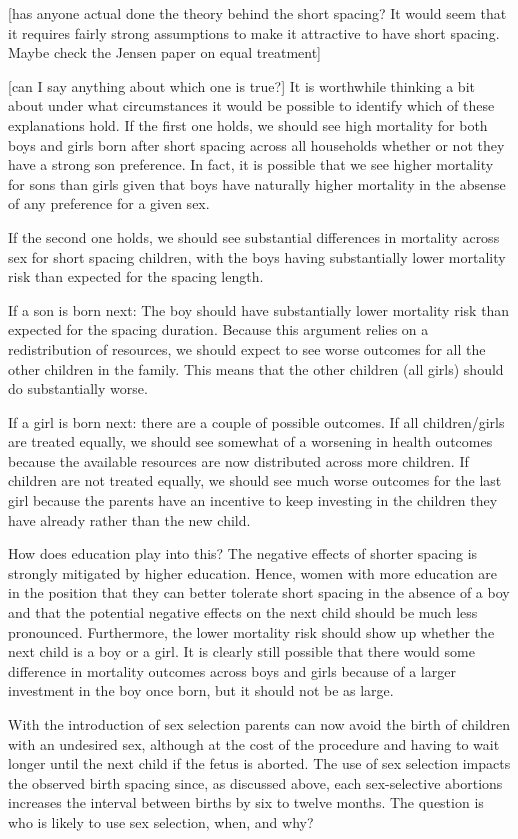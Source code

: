 [has anyone actual done the theory behind the short spacing?
It would seem that it requires fairly strong assumptions to make it attractive to
have short spacing.
Maybe check the Jensen paper on equal treatment]

[can I say anything about which one is true?]
It is worthwhile thinking a bit about under what circumstances it would be possible to
identify which of these explanations hold.
If the first one holds, we should see high mortality for both boys and girls born
after short spacing across all households whether or not they have a strong son preference.
In fact, it is possible that we see higher mortality for sons than girls given that boys 
have naturally higher mortality in the absense of any preference for a given sex.

If the second one holds, we should see substantial differences in mortality across
sex for short spacing children, with the boys having substantially lower mortality risk
than expected for the spacing length.

If a son is born next:
The boy should have substantially lower mortality risk than expected for the spacing
duration.
Because this argument relies on a redistribution of resources, we should expect to see
worse outcomes for all the other children in the family.
This means that the other children (all girls) should do substantially worse.

If a girl is born next:
there are a couple of possible outcomes.
If all children/girls are treated equally, we should see somewhat of a worsening in 
health outcomes because the available resources are now distributed across more children.
If children are not treated equally, we should see much worse outcomes for the last
girl because the parents have an incentive to keep investing in the children they have
already rather than the new child.

How does education play into this?
The negative effects of shorter spacing is strongly mitigated by higher education.
Hence, women with more education are in the position that they can better tolerate short 
spacing in the absence of a boy and that the potential negative effects on the next child 
should be much less pronounced.
Furthermore, the lower mortality risk should show up whether the next child is a boy 
or a girl.
It is clearly still possible that there would some difference in mortality outcomes 
across boys and girls because of a larger investment in the boy once born, but it should
not be as large.

With the introduction of sex selection parents can now avoid the birth of children with 
an undesired sex, although at the cost of the procedure and having to wait longer until 
the next child if the fetus is aborted.
The use of sex selection impacts the observed birth spacing since, as discussed 
above, each sex-selective abortions increases the interval between births by six 
to twelve months.
The question is who is likely to use sex selection, when, and why?

